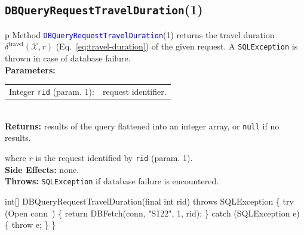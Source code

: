 \subsection{\texttt{DBQueryRequestTravelDuration}(1)}
\begin{tabular}{p{\textwidth}}
\toprule
{}
Method \textcolor{blue}{{\tt{}\protect{}DBQueryRequestTravelDuration}}(1) returns the
travel duration $\delta^\textrm{travel}(\mathcal{X},r)$
(Eq.~\ref{eq:travel-duration}) of the given request.
A {\tt{}SQLException} is thrown in case of database failure.\\
\midrule
\textbf{Parameters:}\\
\begin{tabular}{lp{116mm}}
Integer {\tt{}rid} (param. 1):&request identifier.
\end{tabular}\\
\textbf{Returns:} results of the query flattened into an integer array,
or {\tt{}null} if no results.


where $r$ is the request identified by {\tt{}rid} (param. 1).\\
\textbf{Side Effects:} none.\\
\textbf{Throws:} {\tt{}SQLException} if database failure is encountered.\\
\bottomrule
\end{tabular}
\nwenddocs{}\endmoddef{}
int[] DBQueryRequestTravelDuration(final int rid) throws SQLException \{
  try (\LA{}Open \code{}conn\edoc{}~{\nwtagstyle{}}\RA{}) \{
    return DBFetch(conn, "S122", 1, rid);
  \} catch (SQLException e) \{
    throw e;
  \}
\}
\eatline
{}\nwendcode{}\nwdocspar
